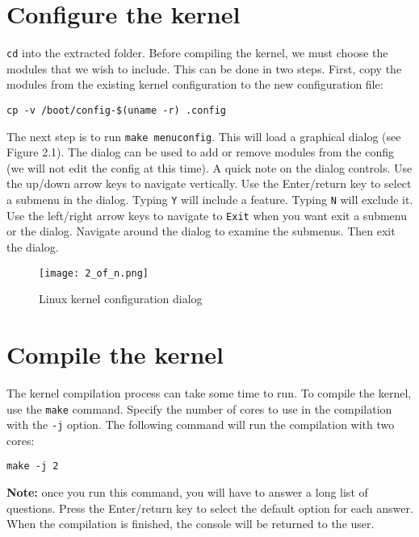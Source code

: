 \documentclass[12pt,a4paper]{report}
\begin{document}
\section{Configure the kernel}
\texttt{cd} into the extracted folder. Before compiling the kernel, we must choose the modules that we wish to include. This can be done in two steps. First, copy the modules from the existing kernel configuration to the new configuration file:
\newline
\newline
\centerline{\texttt{cp -v /boot/config-\$(uname -r) .config}}
\newline
\newline
The next step is to run \texttt{make menuconfig}. This will load a graphical dialog (see Figure 2.1). The dialog can be used to add or remove modules from the config (we will not edit the config at this time).
A quick note on the dialog controls. Use the up/down arrow keys to navigate vertically. Use the Enter/return key to select a submenu in the dialog. Typing \texttt{Y} will include a feature. Typing \texttt{N} will exclude it. Use the left/right arrow keys to navigate to \texttt{Exit} when you want exit a submenu or the dialog.
\newline
\newline
Navigate around the dialog to examine the submenus. Then exit the dialog.

\begin{figure}[t!]
\centerline{\texttt{[image: 2\_of\_n.png]}}
\caption{Linux kernel configuration dialog}
\label{fig}
\end{figure}



\section{Compile the kernel}
The kernel compilation process can take some time to run. To compile the kernel, use the \texttt{make} command. Specify the number of cores to use in the compilation with the \texttt{-j} option. The following command will run the compilation with two cores:
\newline
\newline
\centerline{\texttt{make -j 2}}
\newline
\newline 
\textbf{Note:} once you run this command, you will have to answer a long list of questions. Press the Enter/return key to select the default option for each answer. When the compilation is finished, the console will be returned to the user.
\end{document}
